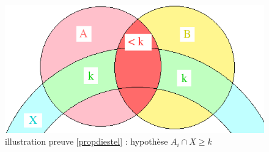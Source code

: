 
\begin{figure}[!ht]
\begin{center}
\includegraphics[scale=0.5]{res/aicapx}
\end{center}
\caption{illustration preuve \ref{propdiestel} : hypothèse $A_i \cap X \geq k$}
\label{fig_aicapx}
\end{figure}

